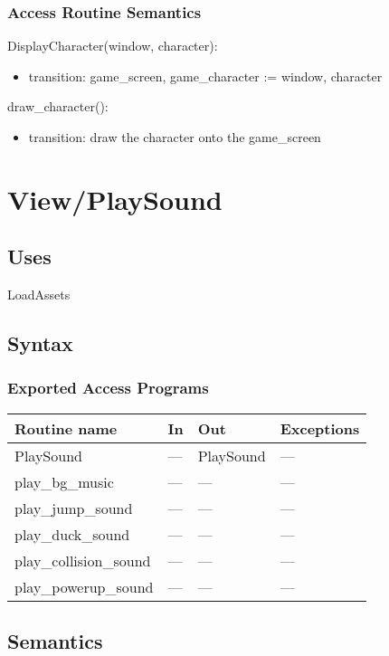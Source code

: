 \documentclass[12pt]{article}
\begin{document}
\subsubsection* {Access Routine Semantics}
DisplayCharacter(window, character):
\begin{itemize}
    \item transition: game\_screen, game\_character := window, character 
\end{itemize}
\noindent draw\_character():
\begin{itemize}
    \item transition: draw the character onto the game\_screen 
\end{itemize}
\newpage
\section*{View/PlaySound}

\subsection* {Uses}
LoadAssets
\subsection* {Syntax}

\subsubsection* {Exported Access Programs}

\begin{tabular}{| l | l | l | l |}
\hline
\textbf{Routine name} & \textbf{In} & \textbf{Out} & \textbf{Exceptions}\\
\hline
    PlaySound & --- & PlaySound & ---\\
\hline
    play\_bg\_music & --- & --- & ---\\
\hline
    play\_jump\_sound & --- & --- & ---\\
\hline
    play\_duck\_sound & --- & --- & ---\\
\hline
    play\_collision\_sound & --- & --- & ---\\
\hline
    play\_powerup\_sound & --- & --- & --- \\
\hline
\end{tabular}

\subsection* {Semantics}
\end{document}
